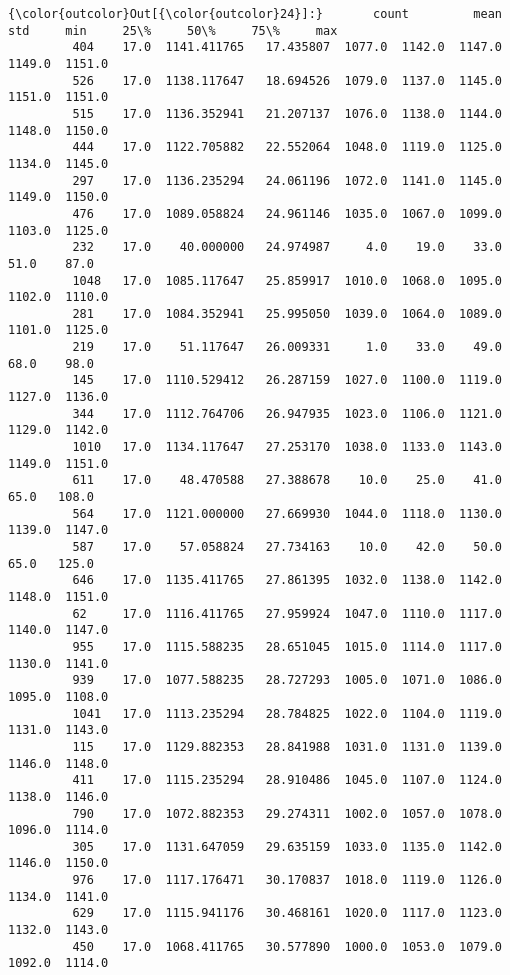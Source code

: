 \documentclass[11pt]{article}
\begin{document}
\begin{Verbatim}[commandchars=\\\{\}]
{\color{outcolor}Out[{\color{outcolor}24}]:}       count         mean         std     min     25\%     50\%     75\%     max
         404    17.0  1141.411765   17.435807  1077.0  1142.0  1147.0  1149.0  1151.0
         526    17.0  1138.117647   18.694526  1079.0  1137.0  1145.0  1151.0  1151.0
         515    17.0  1136.352941   21.207137  1076.0  1138.0  1144.0  1148.0  1150.0
         444    17.0  1122.705882   22.552064  1048.0  1119.0  1125.0  1134.0  1145.0
         297    17.0  1136.235294   24.061196  1072.0  1141.0  1145.0  1149.0  1150.0
         476    17.0  1089.058824   24.961146  1035.0  1067.0  1099.0  1103.0  1125.0
         232    17.0    40.000000   24.974987     4.0    19.0    33.0    51.0    87.0
         1048   17.0  1085.117647   25.859917  1010.0  1068.0  1095.0  1102.0  1110.0
         281    17.0  1084.352941   25.995050  1039.0  1064.0  1089.0  1101.0  1125.0
         219    17.0    51.117647   26.009331     1.0    33.0    49.0    68.0    98.0
         145    17.0  1110.529412   26.287159  1027.0  1100.0  1119.0  1127.0  1136.0
         344    17.0  1112.764706   26.947935  1023.0  1106.0  1121.0  1129.0  1142.0
         1010   17.0  1134.117647   27.253170  1038.0  1133.0  1143.0  1149.0  1151.0
         611    17.0    48.470588   27.388678    10.0    25.0    41.0    65.0   108.0
         564    17.0  1121.000000   27.669930  1044.0  1118.0  1130.0  1139.0  1147.0
         587    17.0    57.058824   27.734163    10.0    42.0    50.0    65.0   125.0
         646    17.0  1135.411765   27.861395  1032.0  1138.0  1142.0  1148.0  1151.0
         62     17.0  1116.411765   27.959924  1047.0  1110.0  1117.0  1140.0  1147.0
         955    17.0  1115.588235   28.651045  1015.0  1114.0  1117.0  1130.0  1141.0
         939    17.0  1077.588235   28.727293  1005.0  1071.0  1086.0  1095.0  1108.0
         1041   17.0  1113.235294   28.784825  1022.0  1104.0  1119.0  1131.0  1143.0
         115    17.0  1129.882353   28.841988  1031.0  1131.0  1139.0  1146.0  1148.0
         411    17.0  1115.235294   28.910486  1045.0  1107.0  1124.0  1138.0  1146.0
         790    17.0  1072.882353   29.274311  1002.0  1057.0  1078.0  1096.0  1114.0
         305    17.0  1131.647059   29.635159  1033.0  1135.0  1142.0  1146.0  1150.0
         976    17.0  1117.176471   30.170837  1018.0  1119.0  1126.0  1134.0  1141.0
         629    17.0  1115.941176   30.468161  1020.0  1117.0  1123.0  1132.0  1143.0
         450    17.0  1068.411765   30.577890  1000.0  1053.0  1079.0  1092.0  1114.0

\end{Verbatim}
\end{document}
